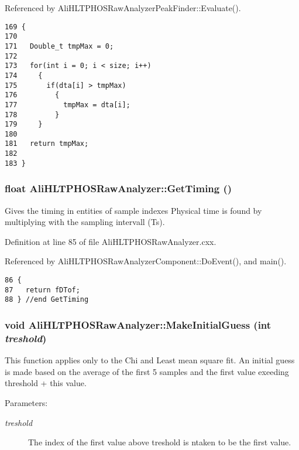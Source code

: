 Referenced by Ali\-HLTPHOSRaw\-Analyzer\-Peak\-Finder::Evaluate().

\footnotesize\begin{verbatim}169 {
170 
171   Double_t tmpMax = 0;
172 
173   for(int i = 0; i < size; i++)
174     {
175       if(dta[i] > tmpMax)
176         {
177           tmpMax = dta[i];
178         }
179     }
180   
181   return tmpMax;
182 
183 }
\end{verbatim}\normalsize 


\subsubsection{\setlength{\rightskip}{0pt plus 5cm}float Ali\-HLTPHOSRaw\-Analyzer::Get\-Timing ()}\label{classAliHLTPHOSRawAnalyzer_a8}


Gives the timing in entities of sample indexes Physical time is found by multiplying with the sampling intervall (Ts). 

Definition at line 85 of file Ali\-HLTPHOSRaw\-Analyzer.cxx.

Referenced by Ali\-HLTPHOSRaw\-Analyzer\-Component::Do\-Event(), and main().

\footnotesize\begin{verbatim}86 {
87   return fDTof;
88 } //end GetTiming
\end{verbatim}\normalsize 


\subsubsection{\setlength{\rightskip}{0pt plus 5cm}void Ali\-HLTPHOSRaw\-Analyzer::Make\-Initial\-Guess (int {\em treshold})}\label{classAliHLTPHOSRawAnalyzer_a14}


This function applies only to the Chi and Least mean square fit. An initial guess is made based on the average of the first 5 samples and the first value exeeding threshold + this value. \begin{Desc}
\item[Parameters:]
\begin{description}
\item[{\em treshold}]The index of the first value above treshold is ntaken to be the first value. \end{description}
\end{Desc}


